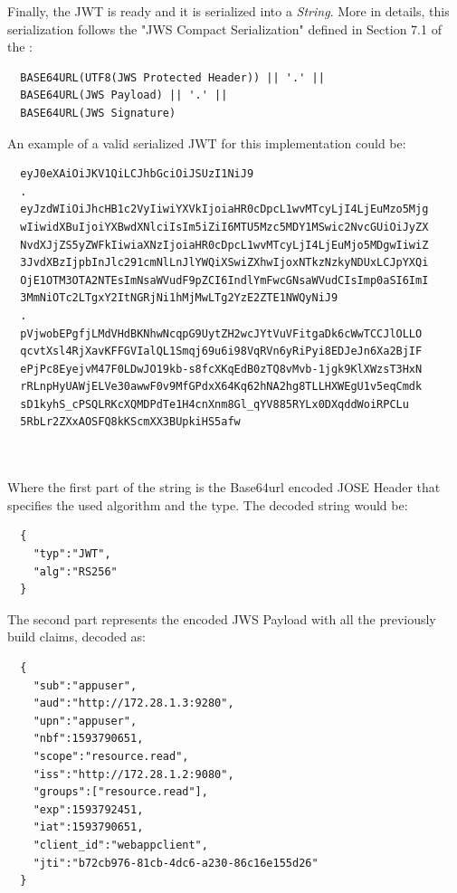 \noindent Finally, the JWT is ready and it is serialized into a \textit{String}. More in details, this serialization follows the "JWS Compact Serialization" defined in Section 7.1 of the  \cite{RFC7515}:

\begin{lstlisting}
  BASE64URL(UTF8(JWS Protected Header)) || '.' ||
  BASE64URL(JWS Payload) || '.' ||
  BASE64URL(JWS Signature)
\end{lstlisting}

\noindent An example of a valid serialized JWT for this implementation could be:

\begin{lstlisting}
  eyJ0eXAiOiJKV1QiLCJhbGciOiJSUzI1NiJ9
  .
  eyJzdWIiOiJhcHB1c2VyIiwiYXVkIjoiaHR0cDpcL1wvMTcyLjI4LjEuMzo5Mjg
  wIiwidXBuIjoiYXBwdXNlciIsIm5iZiI6MTU5Mzc5MDY1MSwic2NvcGUiOiJyZX
  NvdXJjZS5yZWFkIiwiaXNzIjoiaHR0cDpcL1wvMTcyLjI4LjEuMjo5MDgwIiwiZ
  3JvdXBzIjpbInJlc291cmNlLnJlYWQiXSwiZXhwIjoxNTkzNzkyNDUxLCJpYXQi
  OjE1OTM3OTA2NTEsImNsaWVudF9pZCI6IndlYmFwcGNsaWVudCIsImp0aSI6ImI
  3MmNiOTc2LTgxY2ItNGRjNi1hMjMwLTg2YzE2ZTE1NWQyNiJ9
  .
  pVjwobEPgfjLMdVHdBKNhwNcqpG9UytZH2wcJYtVuVFitgaDk6cWwTCCJlOLLO
  qcvtXsl4RjXavKFFGVIalQL1Smqj69u6i98VqRVn6yRiPyi8EDJeJn6Xa2BjIF
  ePjPc8EyejvM47F0LDwJO19kb-s8fcXKqEdB0zTQ8vMvb-1jgk9KlXWzsT3HxN
  rRLnpHyUAWjELVe30awwF0v9MfGPdxX64Kq62hNA2hg8TLLHXWEgU1v5eqCmdk
  sD1kyhS_cPSQLRKcXQMDPdTe1H4cnXnm8Gl_qYV885RYLx0DXqddWoiRPCLu
  5RbLr2ZXxAOSFQ8kKScmXX3BUpkiHS5afw

  
\end{lstlisting}

\noindent Where the first part of the string is the Base64url encoded JOSE Header that specifies the used algorithm and the type. The decoded string would be:

\begin{lstlisting}
  {
    "typ":"JWT",
    "alg":"RS256"
  }
\end{lstlisting}

\noindent The second part represents the encoded JWS Payload with all the previously build claims, decoded as:

\begin{lstlisting}
  {
    "sub":"appuser",
    "aud":"http://172.28.1.3:9280",
    "upn":"appuser",
    "nbf":1593790651,
    "scope":"resource.read",
    "iss":"http://172.28.1.2:9080",
    "groups":["resource.read"],
    "exp":1593792451,
    "iat":1593790651,
    "client_id":"webappclient",
    "jti":"b72cb976-81cb-4dc6-a230-86c16e155d26"
  }
\end{lstlisting}

